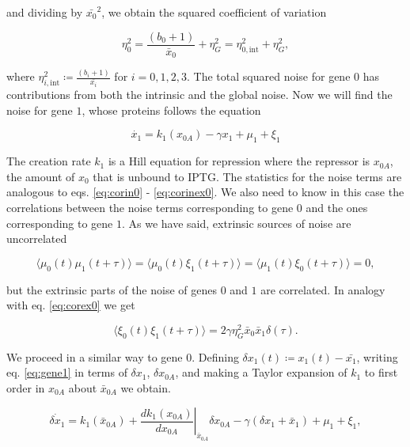 and dividing by $\bar{x_0}^2$, we obtain the squared coefficient of variation

\begin{equation}
  \label{eq:etagene0}
  \eta_0^2 = \frac{(b_0+1)}{\bar{x}_0}+ \eta_G^2 = \eta_{0,\text{int}}^2+\eta_G^2,
\end{equation}

where $\eta_{i,\text{int}}^2\coloneqq\frac{(b_i+1)}{\bar{x_i}}$ for $i=0,1,2,3$. The total squared noise for gene $0$ has contributions from both the intrinsic and the global noise. Now we will find the noise for gene $1$, whose proteins follows the equation

\begin{equation}
\label{eq:gene1}
\dot{x_1} = k_1(x_{0A})-\gamma x_1+\mu_1+\xi_1
\end{equation}

The creation rate $k_1$ is a Hill equation for repression where the repressor is $x_{0A}$, the amount of $x_0$ that is unbound to IPTG. The statistics for the noise terms are analogous to eqs. \eqref{eq:corin0} - \eqref{eq:corinex0}. We also need to know in this case the correlations between the noise terms corresponding to gene $0$ and the ones corresponding to gene $1$. As we have said, extrinsic sources of noise are uncorrelated

\begin{equation}
\label{eq:corcross01}
\langle\mu_0(t)\mu_1(t+\tau)\rangle = \langle\mu_0(t)\xi_1(t+\tau)\rangle = \langle\mu_1(t)\xi_0(t+\tau)\rangle = 0,
\end{equation}

but the extrinsic parts of the noise of genes $0$ and $1$ are correlated. In analogy with eq. \eqref{eq:corex0} we get

\begin{equation*}
  \langle\xi_0(t)\xi_1(t+\tau)\rangle = 2\gamma\eta_G^2\bar{x}_0\bar{x}_1\delta(\tau).
\end{equation*}

We proceed in a similar way to gene $0$. Defining $\delta x_1(t) \coloneqq x_1(t) - \bar{x_1}$, writing eq. \eqref{eq:gene1} in terms of $\delta x_1$, $\delta x_{0A}$, and making a Taylor expansion of $k_1$ to first order in $x_{0A}$ about $\bar{x}_{0A}$ we obtain.

\begin{equation*}
\dot{\delta x_1} = k_1(\bar{x}_{0A}) + \left.\frac{dk_1(x_{0A})}{dx_{0A}}\right|_{\bar{x}_{0A}}\delta x_{0A} - \gamma(\delta x_1 + \bar{x}_1) + \mu_1 + \xi_1,
\end{equation*}


